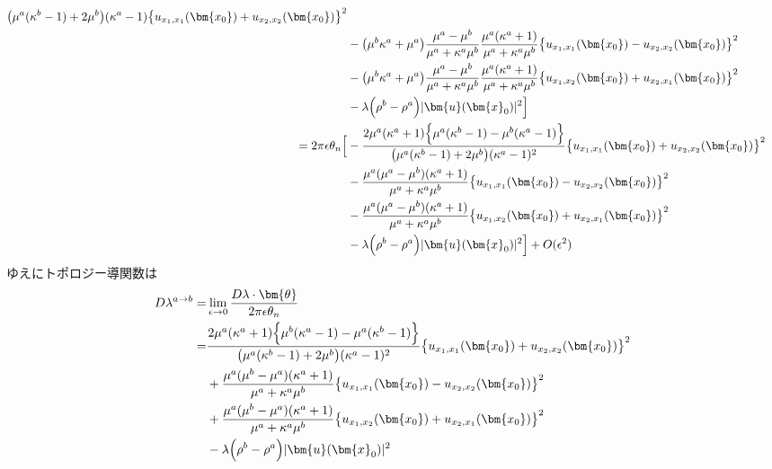 \begin{align}
			{\bigl(\mu^{a}(\kappa^{b}-1)+2\mu^{b}\bigr)(\kappa^{a}-1)}
		\bigl\{u_{x_{1},x_{1}}(\bm{x_{0}})+u_{x_{2},x_{2}}(\bm{x_{0}})\bigr\}^2
		\nonumber
		\\
	&-\bigl(\mu^{b}\kappa^{a}+\mu^{a}\bigr)
		\frac{\mu^{a}-\mu^{b}}{\mu^{a}+\kappa^{a}\mu^{b}}
		\frac{\mu^{a}(\kappa^{a}+1)}{\mu^{a}+\kappa^{a}\mu^{b}}
		\bigl\{u_{x_{1},x_{1}}(\bm{x_{0}})-u_{x_{2},x_{2}}(\bm{x_{0}})\bigr\}^2
		\nonumber
		\\
	&-\bigl(\mu^{b}\kappa^{a}+\mu^{a}\bigr)
		\frac{\mu^{a}-\mu^{b}}{\mu^{a}+\kappa^{a}\mu^{b}}
		\frac{\mu^{a}(\kappa^{a}+1)}{\mu^{a}+\kappa^{a}\mu^{b}}
		\bigl\{u_{x_{1},x_{2}}(\bm{x_{0}})+u_{x_{2},x_{1}}(\bm{x_{0}})\bigr\}^2
		\nonumber
		\\
	&-\lambda\Bigr(\rho^{b}-\rho^{a}\Bigl)|\bm{u}(\bm{x}_{0})|^{2}
	\Bigr]
	\nonumber
	\\
	=2\pi\epsilon\theta_{n}\Bigl[
	&-\frac{2\mu^{a}(\kappa^{a}+1)\Bigl\{\mu^{a}(\kappa^{b}-1)-\mu^{b}(\kappa^{a}-1)\Bigl\}}
			{\bigl(\mu^{a}(\kappa^{b}-1)+2\mu^{b}\bigr)(\kappa^{a}-1)^2}
		\bigl\{u_{x_{1},x_{1}}(\bm{x_{0}})+u_{x_{2},x_{2}}(\bm{x_{0}})\bigr\}^2
		\nonumber
		\\
	&-\frac{\mu^{a}(\mu^{a}-\mu^{b})(\kappa^{a}+1)}{\mu^{a}+\kappa^{a}\mu^{b}}
		\bigl\{u_{x_{1},x_{1}}(\bm{x_{0}})-u_{x_{2},x_{2}}(\bm{x_{0}})\bigr\}^2
		\nonumber
		\\
	&-\frac{\mu^{a}(\mu^{a}-\mu^{b})(\kappa^{a}+1)}{\mu^{a}+\kappa^{a}\mu^{b}}
		\bigl\{u_{x_{1},x_{2}}(\bm{x_{0}})+u_{x_{2},x_{1}}(\bm{x_{0}})\bigr\}^2
		\nonumber
		\\
	&-\lambda\Bigr(\rho^{b}-\rho^{a}\Bigl)|\bm{u}(\bm{x}_{0})|^{2}
	\Bigr]+O(\epsilon^2)
	\label{eq:SDForTDRTh}
\end{align}
ゆえにトポロジー導関数は
\begin{align}
	D\lambda^{a\rightarrow b}=&\lim_{\epsilon \to 0} \frac{D\lambda\cdot\bm{\theta}}{2\pi\epsilon\theta_{n}}
	\nonumber
	\\
	=&\frac{2\mu^{a}(\kappa^{a}+1)\Bigl\{\mu^{b}(\kappa^{a}-1)-\mu^{a}(\kappa^{b}-1)\Bigl\}}
			{\bigl(\mu^{a}(\kappa^{b}-1)+2\mu^{b}\bigr)(\kappa^{a}-1)^2}
		\bigl\{u_{x_{1},x_{1}}(\bm{x_{0}})+u_{x_{2},x_{2}}(\bm{x_{0}})\bigr\}^2
		\nonumber
		\\
	&+\frac{\mu^{a}(\mu^{b}-\mu^{a})(\kappa^{a}+1)}{\mu^{a}+\kappa^{a}\mu^{b}}
		\bigl\{u_{x_{1},x_{1}}(\bm{x_{0}})-u_{x_{2},x_{2}}(\bm{x_{0}})\bigr\}^2
		\nonumber
		\\
	&+\frac{\mu^{a}(\mu^{b}-\mu^{a})(\kappa^{a}+1)}{\mu^{a}+\kappa^{a}\mu^{b}}
		\bigl\{u_{x_{1},x_{2}}(\bm{x_{0}})+u_{x_{2},x_{1}}(\bm{x_{0}})\bigr\}^2
		\nonumber
		\\
	&-\lambda\Bigr(\rho^{b}-\rho^{a}\Bigl)|\bm{u}(\bm{x}_{0})|^{2}
	\label{eq:TD}
\end{align}
